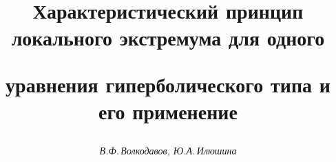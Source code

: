 

 


% 


 


\newcommand{\const}{\operatorname{const}} 


\newcommand{\tts}[1]{} 




 




 


\setcounter{page}{13} 












 


\author{\it В.Ф.\,Волкодавов, Ю.А.\,Илюшина} 




\title{Характеристический принцип локального экстремума для одного 


уравнения гиперболического типа и его применение} 


 


\date{} 




\pagestyle{plain} %


 




